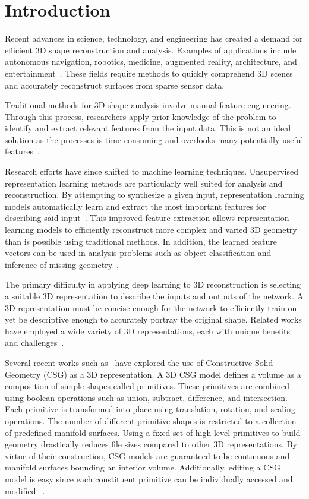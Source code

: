 
\chapter{Introduction}

Recent advances in science, technology, and engineering has created a demand for efficient 3D shape reconstruction and analysis. Examples of applications include autonomous navigation, robotics, medicine, augmented reality, architecture, and entertainment~\cite{Xiao2020, Xie2022}. These fields require methods to quickly comprehend 3D scenes and accurately reconstruct surfaces from sparse sensor data.

Traditional methods for 3D shape analysis involve manual feature engineering. Through this process, researchers apply prior knowledge of the problem to identify and extract relevant features from the input data. This is not an ideal solution as the processes is time consuming and overlooks many potentially useful features~\cite{Bengio2013}.

Research efforts have since shifted to machine learning techniques. Unsupervised representation learning methods are particularly well suited for analysis and reconstruction. By attempting to synthesize a given input, representation learning models automatically learn and extract the most important features for describing said input~\cite{Bengio2013}. This improved feature extraction allows representation learning models to efficiently reconstruct more complex and varied 3D geometry than is possible using traditional methods. In addition, the learned feature vectors can be used in analysis problems such as object classification and inference of missing geometry~\cite{Park2019}.

The primary difficulty in applying deep learning to 3D reconstruction is selecting a suitable 3D representation to describe the inputs and outputs of the network. A 3D representation must be concise enough for the network to efficiently train on yet be descriptive enough to accurately portray the original shape. Related works have employed a wide variety of 3D representations, each with unique benefits and challenges~\cite{Xiao2020}.

Several recent works such as~\cite{Sharma2018, Kania2020, Ren2021} have explored the use of Constructive Solid Geometry (CSG) as a 3D representation. A 3D CSG model defines a volume as a composition of simple shapes called primitives. These primitives are combined using boolean operations such as union, subtract, difference, and intersection. Each primitive is transformed into place using translation, rotation, and scaling operations. The number of different primitive shapes is restricted to a collection of predefined manifold surfaces. Using a fixed set of high-level primitives to build geometry drastically reduces file sizes compared to other 3D representations. By virtue of their construction, CSG models are guaranteed to be continuous and manifold surfaces bounding an interior volume. Additionally, editing a CSG model is easy since each constituent primitive can be individually accessed and modified.~\cite{Hughes2013}.

